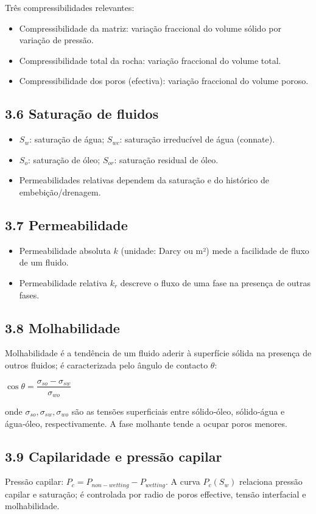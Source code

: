 \documentclass[11pt,a4paper]{article}
\begin{document}
Três compressibilidades relevantes:
\begin{itemize}
\item Compressibilidade da matriz: variação fraccional do volume sólido por variação de pressão.
\item Compressibilidade total da rocha: variação fraccional do volume total.
\item Compressibilidade dos poros (efectiva): variação fraccional do volume poroso.
\end{itemize}

\subsection{3.6 Saturação de fluidos}
\begin{itemize}
\item $S_w$: saturação de água; $S_{wc}$: saturação irreducível de água (connate). 
\item $S_o$: saturação de óleo; $S_{or}$: saturação residual de óleo.
\item Permeabilidades relativas dependem da saturação e do histórico de embebição/drenagem.
\end{itemize}

\subsection{3.7 Permeabilidade}
\begin{itemize}
\item Permeabilidade absoluta $k$ (unidade: Darcy ou m²) mede a facilidade de fluxo de um fluido.
\item Permeabilidade relativa $k_{r}$ descreve o fluxo de uma fase na presença de outras fases.
\end{itemize}

\subsection{3.8 Molhabilidade}
Molhabilidade é a tendência de um fluido aderir à superfície sólida na presença de outros fluidos; é caracterizada pelo ângulo de contacto $\theta$:

$\cos\theta = \dfrac{\sigma_{so}-\sigma_{sw}}{\sigma_{wo}}$

onde $\sigma_{so},\sigma_{sw},\sigma_{wo}$ são as tensões superficiais entre sólido‑óleo, sólido‑água e água‑óleo, respectivamente. A fase molhante tende a ocupar poros menores.

\subsection{3.9 Capilaridade e pressão capilar}
Pressão capilar: $P_c = P_{non-wetting} - P_{wetting}$. A curva $P_c(S_w)$ relaciona pressão capilar e saturação; é controlada por radio de poros effective, tensão interfacial e molhabilidade.
\end{document}
